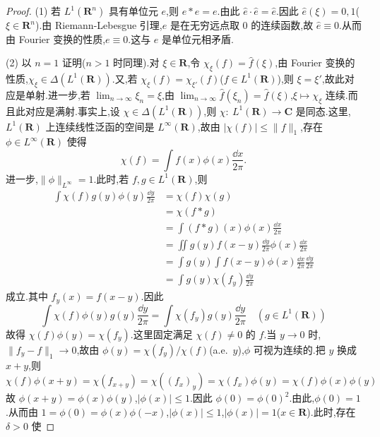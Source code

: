 \begin{proof}
(1) 若 $L^{1}(\mathbf{R}^{n})$ 具有单位元 $e$,则 $e * e = e$.由此 $\hat{e} \cdot \hat{e} = \hat{e}$.因此 $\hat{e}(\xi) = 0, 1$($\xi \in \mathbf{R}^{n}$).由 Riemann-Lebesgue 引理,$\hat{e}$ 是在无穷远点取 $0$ 的连续函数,故 $\hat{e} \equiv 0$.从而由 Fourier 变换的性质,$e \equiv 0$.这与 $e$ 是单位元相矛盾.

(2) 以 $n = 1$ 证明($n > 1$ 时同理).对 $\xi \in \mathbf{R}$,令 $\chi_{\xi}(f) = \hat{f}(\xi)$,由 Fourier 变换的性质,$\chi_{\xi} \in \Delta(L^{1}(\mathbf{R}))$.又,若 $\chi_{\xi}(f) = \chi_{\xi'}(f)$($f \in L^{1}(\mathbf{R})$),则 $\xi = \xi'$,故此对应是单射.进一步,若 $\lim_{n \to \infty}\xi_{n} = \xi$,由 $\lim_{n \to \infty}\hat{f}(\xi_{n}) = \hat{f}(\xi)$,$\xi \mapsto \chi_{\xi}$ 连续.而且此对应是满射.事实上,设 $\chi \in \Delta(L^{1}(\mathbf{R}))$,则 $\chi:\ L^{1}(\mathbf{R}) \to \mathbf{C}$ 是同态.这里,$L^{1}(\mathbf{R})$ 上连续线性泛函的空间是 $L^{\infty}(\mathbf{R})$,故由 $|\chi(f)| \leq \|f\|_{1}$,存在 $\phi \in L^{\infty}(\mathbf{R})$ 使得
\begin{equation*}
\chi(f) = \int f(x)\phi(x)\frac{\dd x}{2\pi}.
\end{equation*}
进一步,$\|\phi\|_{L^{\infty}} = 1$.此时,若 $f, g \in L^{1}(\mathbf{R})$,则
\begin{align*}
\int \chi(f)g(y)\phi(y)\frac{\dd y}{2\pi} & = \chi(f)\chi(g) \\
& = \chi(f * g) \\
& = \int (f * g)(x)\phi(x)\frac{\dd x}{2\pi} \\
& = \iint g(y)f(x - y)\frac{\dd y}{2\pi}\phi(x)\frac{\dd x}{2\pi} \\
& = \int g(y)\int f(x - y)\phi(x)\frac{\dd x}{2\pi}\frac{\dd y}{2\pi} \\
& = \int g(y)\chi(f_{y})\frac{\dd y}{2\pi}
\end{align*}
成立.其中 $f_{y}(x) = f(x - y)$.因此
\begin{equation*}
\int \chi(f)\phi(y)g(y)\frac{\dd y}{2\pi} = \int \chi(f_{y})g(y)\frac{\dd y}{2\pi} \quad (g \in L^{1}(\mathbf{R}))
\end{equation*}
故得 $\chi(f)\phi(y) = \chi(f_{y})$.这里固定满足 $\chi(f) \neq 0$ 的 $f$.当 $y \to 0$ 时,$\|f_{y} - f\|_{1} \to 0$,故由 $\phi(y) = \chi(f_{y})/\chi(f)$(a.e.\ $y$),$\phi$ 可视为连续的.把 $y$ 换成 $x + y$,则
\begin{equation*}
\chi(f)\phi(x + y) = \chi(f_{x + y}) = \chi((f_{x})_{y}) = \chi(f_{x})\phi(y) = \chi(f)\phi(x)\phi(y)
\end{equation*}
故 $\phi(x + y) = \phi(x)\phi(y)$,$|\phi(x)| \leq 1$.因此 $\phi(0) = \phi(0)^{2}$.由此,$\phi(0) = 1$.从而由 $1 = \phi(0) = \phi(x)\phi(-x)$,$|\phi(x)| \leq 1$,$|\phi(x)| = 1$($x \in \mathbf{R}$).此时,存在 $\delta > 0$ 使

\end{proof}

